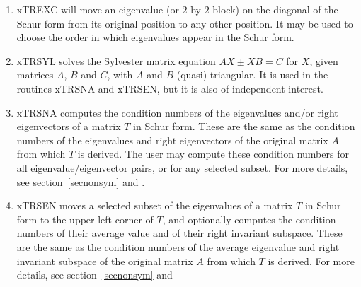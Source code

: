 \begin{enumerate}

\item xTREXC will move an eigenvalue (or $2$-by-$2$ block) on the diagonal of
the Schur form from its original position to any other position. It may be used to
choose the order in which eigenvalues appear in the Schur form.

\item xTRSYL solves
the Sylvester matrix equation $AX \pm XB=C$ for $X$, given
matrices $A$, $B$ and $C$, with $A$ and $B$ (quasi) triangular.
It is used in the routines xTRSNA and xTRSEN, but it is also of independent
interest.

\item xTRSNA computes the condition numbers of the eigenvalues and/or
right eigenvectors of a matrix $T$ in Schur form.
These are the same as the condition
numbers of the eigenvalues and right eigenvectors of the original matrix
$A$ from which $T$ is derived. The user may compute these condition numbers
for all eigenvalue/eigenvector pairs, or for any selected subset.
For more details, see section~\ref{secnonsym} and \cite{baidemmelmckenney}.

\item xTRSEN moves
a selected subset of the eigenvalues of a matrix $T$
in Schur form to the upper left corner of $T$, and optionally computes
the condition numbers of their average value and of their right
invariant subspace. These are the same as the condition numbers of the
average eigenvalue and right invariant subspace of the original matrix $A$
from which $T$ is derived.
For more details, see section~\ref{secnonsym} and
\cite{baidemmelmckenney}

\end{enumerate}


